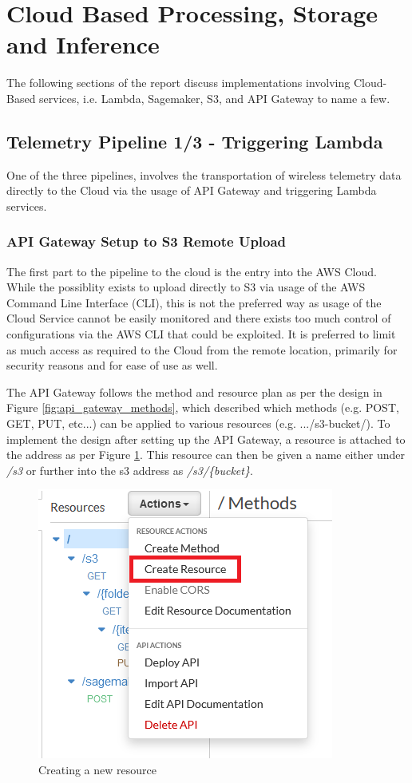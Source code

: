 \section{Cloud Based Processing, Storage and Inference}
The following sections of the report discuss implementations involving Cloud-Based services, i.e. Lambda, Sagemaker, S3, and API Gateway to name a few.
\subsection{Telemetry Pipeline 1/3 - Triggering Lambda}
One of the three pipelines, involves the transportation of wireless telemetry data directly to the Cloud via the usage of API Gateway and triggering Lambda services. 
\subsubsection{API Gateway Setup to S3 Remote Upload}
The first part to the pipeline to the cloud is the entry into the AWS Cloud. While the possiblity exists to upload directly to S3 via usage of the AWS Command Line Interface (CLI), this is not the preferred way as usage of the Cloud Service cannot be easily monitored and there exists too much control of configurations via the AWS CLI that could be exploited. It is preferred to limit as much access as required to the Cloud from the remote location, primarily for security reasons and for ease of use as well. 

The API Gateway follows the method and resource plan as per the design in Figure \ref{fig:api_gateway_methods}, which described which methods (e.g. POST, GET, PUT, etc...) can be applied to various resources (e.g. .../{s3-bucket}/). To implement the design after setting up the API Gateway, a resource is attached to the address as per Figure \ref{fig:attach_new_resource_api_gateway}. This resource can then be given a name either under \textit{/s3} or further into the s3 address as \textit{/s3/\{bucket\}}.

\begin{figure}[ht]
    \centering
    \includegraphics{pages/Chapter4/Chapter 4 Images/create_method_api_gateway.png}
    \caption{Creating a new resource}
    \label{fig:attach_new_resource_api_gateway}
\end{figure}

